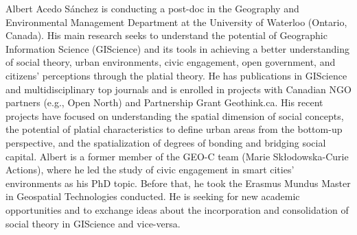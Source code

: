 \documentclass[11pt, a4paper]{awesome-cv}
\begin{document}
\makecvheader[R]



\begin{cvletter}

Albert Acedo S\'anchez is conducting a post-doc in the Geography and Environmental Management Department at the University of Waterloo (Ontario, Canada). His main research seeks to understand the potential of Geographic Information Science (GIScience) and its tools in achieving a better understanding of social theory, urban environments, civic engagement, open government, and citizens’ perceptions through the platial theory. He has publications in GIScience and multidisciplinary top journals and is enrolled in projects with Canadian NGO partners (e.g., Open North) and Partnership Grant Geothink.ca. His recent projects have focused on understanding the spatial dimension of social concepts, the potential of platial characteristics to define urban areas from the bottom-up perspective, and the spatialization of degrees of bonding and bridging social capital. Albert is a former member of the GEO-C team (Marie Skłodowska-Curie Actions), where he led the study of civic engagement in smart cities’ environments as his PhD topic. Before that, he took the Erasmus Mundus Master in Geospatial Technologies conducted. He is seeking for new academic opportunities and to exchange ideas about the incorporation and consolidation of social theory in GIScience and vice-versa. 


\end{cvletter}


\end{document}
